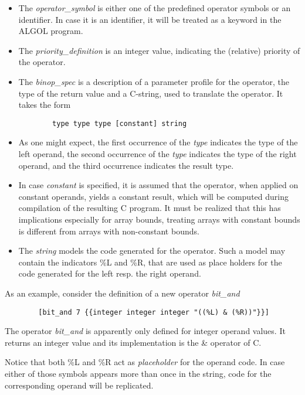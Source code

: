 \documentclass[11pt]{article}
\begin{document}
\begin{itemize}
\item The {\em operator\_symbol} is either one of
the predefined operator symbols or an identifier.
In case it is an identifier, it will be treated as
a keyword in the ALGOL program.
\item
The {\em priority\_definition} is an integer value,
indicating the (relative) priority of the operator. 
\item
The {\em binop\_spec} is a description of a parameter profile for the
operator, the type of the return value and a C-string, used
to translate the operator. It takes the form
{\footnotesize
\begin{verbatim}
        type type type [constant] string
\end{verbatim}
}
\end{itemize}
\begin{itemize}
\item As one might expect, the first occurrence of the {\em type} indicates the
type of the left operand, the second occurrence of the {\em type}
indicates the type of the right operand, and the third occurrence
indicates the result type.
\item In case {\em constant} is specified, it is assumed that the operator, when
applied on constant operands, yields a constant result, which will
be computed during compilation of the resulting C program. It must be realized
that this has implications especially for array bounds, treating
arrays with constant bounds is different from arrays
with non-constant bounds.
\item The {\em string} models the code generated for the operator. 
Such a model may contain
the indicators \%L and \%R, that are used as
place holders for the code generated for
the left resp. the right operand.  
\end{itemize}
As an example, consider the definition of a new operator {\em bit\_and}
{\footnotesize
\begin{verbatim}
        [bit_and 7 {{integer integer integer "((%L) & (%R))"}}]
\end{verbatim}
}
The operator {\em bit\_and} is apparently only defined
for integer operand values. It returns an integer value
and its implementation is the \& operator of C.

Notice that both \%L and \%R act as {\em placeholder} for the operand code.
In case either of those symbols appears more than once in the string,
code for the corresponding operand will be replicated.
\end{document}
